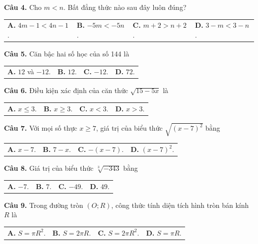 \documentclass[11pt,a4paper]{article}
\begin{document}
\vspace{1.5mm}
\textbf{Câu 4.} Cho $m < n$. Bất đẳng thức nào sau đây luôn đúng?\\
\begin{tabularx}{\linewidth}{XXXX}
\textbf{A.} $4m - 1 < 4n - 1$. & \textbf{B.} $-5m < -5n$. & \textbf{C.} $m + 2 > n + 2$. & \textbf{D.} $3 - m < 3 - n$.
\end{tabularx}

\vspace{1.5mm}
\textbf{Câu 5.} Căn bậc hai số học của số 144 là\\
\begin{tabularx}{\linewidth}{XXXX}
\textbf{A.} $12$ và $-12$. & \textbf{B.} $12$. & \textbf{C.} $-12$. & \textbf{D.} $72$.
\end{tabularx}

\vspace{1.5mm}
\textbf{Câu 6.} Điều kiện xác định của căn thức $\sqrt{15 - 5x}$ là\\
\begin{tabularx}{\linewidth}{XXXX}
\textbf{A.} $x \le 3$. & \textbf{B.} $x \ge 3$. & \textbf{C.} $x < 3$. & \textbf{D.} $x > 3$.
\end{tabularx}

\vspace{1.5mm}
\textbf{Câu 7.} Với mọi số thực $x \ge 7$, giá trị của biểu thức $\sqrt{(x-7)^2}$ bằng\\
\begin{tabularx}{\linewidth}{XXXX}
\textbf{A.} $x - 7$. & \textbf{B.} $7 - x$. & \textbf{C.} $-(x-7)$. & \textbf{D.} $(x-7)^2$.
\end{tabularx}

\vspace{1.5mm}
\textbf{Câu 8.} Giá trị của biểu thức $\sqrt[3]{-343}$ bằng\\
\begin{tabularx}{\linewidth}{XXXX}
\textbf{A.} $-7$. & \textbf{B.} $7$. & \textbf{C.} $-49$. & \textbf{D.} $49$.
\end{tabularx}

\vspace{1.5mm}
\textbf{Câu 9.} Trong đường tròn $(O; R)$, công thức tính diện tích hình tròn bán kính $R$ là\\
\begin{tabularx}{\linewidth}{XXXX}
\textbf{A.} $S = \pi R^2$. & \textbf{B.} $S = 2\pi R$. & \textbf{C.} $S = 2\pi R^2$. & \textbf{D.} $S = \pi R$.
\end{tabularx}
\end{document}
